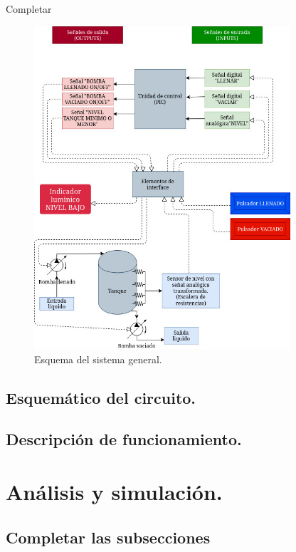 \documentclass[a4paper]{article}
\begin{document}
    Completar

    \begin{figure}[h]\centering
        \includegraphics[height=12cm]{diagrama_sistema.jpg}
        \caption{Esquema del sistema general.}\label{fig:esquematico1}
    \end{figure}

    \subsection{Esquemático del circuito.}

    \subsection{Descripción de funcionamiento.}



    
\section{Análisis y simulación.}

\subsection{Completar las subsecciones}
\end{document}
